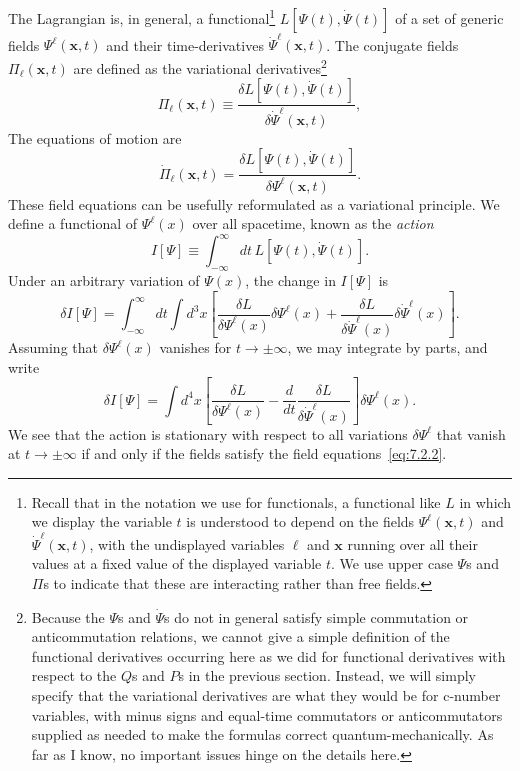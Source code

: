 The Lagrangian is, in general, a functional\footnote{Recall that in the notation
we use for functionals, a functional like $L$ in which we display the variable
$t$ is understood to depend on the fields $\Psi^\ell(\mathbf{x},t)$ and
$\dot\Psi^\ell(\mathbf{x},t)$, with the undisplayed variables $\ell$ and $\mathbf{x}$
running over all their values at a fixed value of the displayed variable $t$.
We use upper case $\Psi$s and $\Pi$s to indicate that these are interacting
rather than free fields.} $L[\Psi(t),\dot\Psi(t)]$ of a set of generic fields
$\Psi^\ell(\mathbf{x},t)$ and their time-derivatives $\dot\Psi^\ell(\mathbf{x},t)$.
The conjugate fields $\Pi_\ell(\mathbf{x},t)$ are defined as the variational
derivatives\footnote{Because the $\Psi$s and $\dot\Psi$s do not in general satisfy
simple commutation or anticommutation relations, we cannot give a simple
definition of the functional derivatives occurring here as we did for functional
derivatives with respect to the $Q$s and $P$s in the previous section. Instead,
we will simply specify that the variational derivatives are what they would be
for c-number variables, with minus signs and equal-time commutators or
anticommutators supplied as needed to make the formulas correct
quantum-mechanically. As far as I know, no important issues hinge on the details
here.}
\begin{equation}
\Pi_\ell(\mathbf{x},t)\equiv
\frac{\delta L[\Psi(t),\dot\Psi(t)]}{\delta\dot\Psi^\ell(\mathbf{x},t)},
\tag{7.2.1}\label{eq:7.2.1}
\end{equation}
The equations of motion are
\begin{equation}
\dot\Pi_\ell(\mathbf{x},t)=
\frac{\delta L[\Psi(t),\dot\Psi(t)]}{\delta\Psi^\ell(\mathbf{x},t)}.
\tag{7.2.2}\label{eq:7.2.2}
\end{equation}
These field equations can be usefully reformulated as a variational principle.
We define a functional of $\Psi^\ell(x)$ over all spacetime, known as the
\textit{action}
\begin{equation}
I[\Psi]\equiv\int_{-\infty}^{\infty}dt\,L[\Psi(t),\dot\Psi(t)].
\tag{7.2.3}\label{eq:7.2.3}
\end{equation}
Under an arbitrary variation of $\Psi(x)$, the change in $I[\Psi]$ is
\[
\delta I[\Psi]=\int_{-\infty}^{\infty}dt\int d^3x
\left[\frac{\delta L}{\delta\Psi^\ell(x)}\delta\Psi^\ell(x)
+\frac{\delta L}{\delta\dot\Psi^\ell(x)}\delta\dot\Psi^\ell(x)\right].
\]
Assuming that $\delta\Psi^\ell(x)$ vanishes for $t\to\pm\infty$, we may integrate
by parts, and write
\begin{equation}
\delta I[\Psi]=\int d^4x\left[
\frac{\delta L}{\delta\Psi^\ell(x)}
-\frac{d}{dt}\frac{\delta L}{\delta\dot\Psi^\ell(x)}
\right]\delta\Psi^\ell(x).
\tag{7.2.4}\label{eq:7.2.4}
\end{equation}
We see that the action is stationary with respect to all variations $\delta\Psi^\ell$
that vanish at $t\to\pm\infty$ if and only if the fields satisfy the field
equations~\eqref{eq:7.2.2}.

